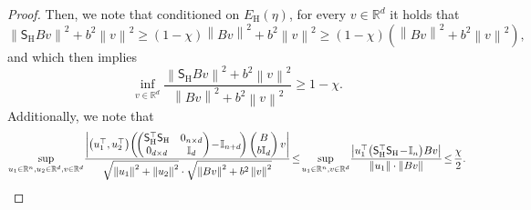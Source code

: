\documentclass[11pt]{article}
\theoremstyle{definition}
\theoremstyle{plain}
\newcommand{\reals}{\mathbb{R}}
\providecommand{\brI}{\mathbb{I}}
\newcommand{\Norm}[1]{\left\| #1 \right\|}
\providecommand{\norm}[1]{\Norm{#1}}
\begin{document}
\begin{proof}
Then, we note that conditioned on $E_{\mathrm{H}}(\eta)$, for every $v\in \reals^{d}$ it holds that 
\begin{equation}
    \norm{\mathsf{S}_{\mathrm{H}}B v}^2 + b^2\norm{v}^2 \geq (1-\chi)\norm{B v}^2 + b^2\norm{v}^2 \geq (1-\chi)\left(\norm{B v}^2 + b^2\norm{v}^2\right),
\end{equation}
and which then implies
\begin{equation}
    \label{eq:event_aug_SRHT_sketch_A2}
    \inf_{v \in \reals^{d}} \frac{\norm{\mathsf{S}_{\mathrm{H}}B v}^2 + b^2 \norm{v}^2}{\norm{Bv}^{2} + b^2 \norm{v}^2} \geq 1-\chi.
\end{equation}
Additionally, we note that 
\begin{equation}
    \label{eq:event_aug_SRHT_sketch_A1}
    \sup_{u_1 \in \reals^{n}, u_2 \in \reals^{d}, v \in \reals^{d}} \hspace{-0.15em}\frac{\left|\left(u^{\top}_1, u^{\top}_2\right)\hspace{-0.15em}\left(\hspace{-0.15em}\begin{pmatrix}
        \mathsf{S}_{\mathrm{H}}^{\top}\mathsf{S}_{\mathrm{H}} & 0_{n\times d} \\ 0_{d\times d} & \brI_d
    \end{pmatrix} \hspace{-0.15em}-\hspace{-0.15em} \brI_{n+d}\hspace{-0.15em}\right) \begin{pmatrix}
        B \\ b\brI_d
    \end{pmatrix} v\right|}{\sqrt{\norm{u_1}^2 + \norm{u_2}^2} \cdot \sqrt{\norm{B v}^2 + b^2 \norm{v}^2}} \hspace{-0.15em}\leq\hspace{-0.15em} \sup_{u_1 \in \reals^{n},v \in \reals^{d}}\hspace{-0.15em} \frac{\left|u^{\top}_1\hspace{-0.15em}\left(\mathsf{S}_{\mathrm{H}}^{\top}\mathsf{S}_{\mathrm{H}} \hspace{-0.15em}-\hspace{-0.15em} \brI_{n}\right)\hspace{-0.15em}B v\right|}{\norm{u_1} \cdot \norm{B v}} \hspace{-0.15em}\leq\hspace{-0.15em} \frac{\chi}{2}.
\end{equation}


\end{proof}
\end{document}
